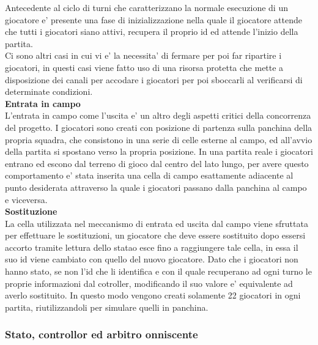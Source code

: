 Antecedente al ciclo di turni che caratterizzano la normale esecuzione di un giocatore e' presente una fase di inizializzazione nella quale il giocatore attende che tutti i giocatori siano attivi, recupera il proprio id ed attende l'inizio della partita.\\

Ci sono altri casi in cui vi e' la necessita' di fermare per poi far ripartire i giocatori, in questi casi viene fatto uso di una risorsa protetta che mette a disposizione dei canali per accodare i giocatori per poi sboccarli al verificarsi di determinate condizioni.\\

\textbf{Entrata in campo}\\

L'entrata in campo come l'uscita e' un altro degli aspetti critici della concorrenza del progetto. I giocatori sono creati con posizione di partenza sulla panchina della propria squadra, che consistono in una serie di celle esterne al campo, ed all'avvio della partita si spostano verso la propria posizione. In una partita reale i giocatori entrano ed escono dal terreno di gioco dal centro del lato lungo, per avere questo comportamento e' stata inserita una cella di campo esattamente adiacente al punto desiderata attraverso la quale i giocatori passano dalla panchina al campo e viceversa.\\

\textbf{Sostituzione}\\

La cella utilizzata nel meccanismo di entrata ed uscita dal campo viene sfruttata per effettuare le sostituzioni, un giocatore che deve essere sostituito dopo essersi accorto tramite lettura dello statao esce fino a raggiungere tale cella, in essa il suo id viene cambiato con quello del nuovo giocatore. Dato che i giocatori non hanno stato, se non l'id che li identifica e con il quale recuperano ad ogni turno le proprie informazioni dal cotroller, modificando il suo valore e' equivalente ad averlo sostituito. In questo modo vengono creati solamente 22 giocatori in ogni partita, riutilizzandoli per simulare quelli in panchina.\\

\subsubsection{Stato, controllor ed arbitro onniscente}
\label{sec:analisi_concorrenza_controller_arbitro}

